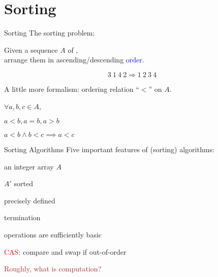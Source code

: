 \section{Sorting}

\begin{frame}{Sorting}
  The sorting problem:
  \begin{center}
	Given a sequence $A$ of ,\\
	arrange them in ascending/descending \textcolor<3->{blue}{order}.
  \end{center}

  \pause

  \[
	3\ 1\ 4\ 2 \Longrightarrow 1\ 2\ 3\ 4
  \]

  \pause
  \vspace{0.20cm}

  A little more formalism: ordering relation ``$<$'' on $A$.

  \vspace{0.20cm}
  $\forall a, b, c \in A$,
  \begin{description}[Transitivity:]
	\item[Trichotomy:] $a < b, a = b, a > b$
	\item[Transitivity:] $a < b \land b < c \implies a < c$
  \end{description}
\end{frame}
\begin{frame}{Sorting Algorithms}
  Five important features of (sorting) algorithms:
  \begin{description}[Effectiveness:]
	\item[Input:] an integer array $A$
	\item[Ouput:] $A'$ sorted
	\item[Definiteness:] precisely defined
	  \pause
	\item[\textcolor{red}{Finiteness:}] termination
	  \pause
	\item[\textcolor{red}{Effectiveness:}] operations are sufficiently basic

	  \textcolor{red}{CAS}: compare and swap if out-of-order
  \end{description}

  \pause
  \vspace{0.30cm}

  \begin{center}
	\textcolor{brown}{Roughly, what is computation?}
  \end{center}
\end{frame}
